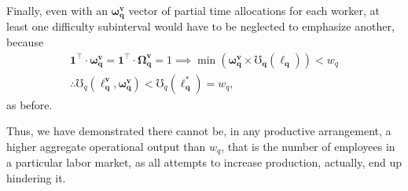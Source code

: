 \documentclass[hidelinks, nonatbib]{elsarticle}
\begin{document}
\begin{enumerate}
    Finally, even with an $\boldsymbol{\omega_{q}^{v}}$ vector of partial time allocations for each worker, at least one difficulty subinterval would have to be neglected to emphasize another, because
    \begin{gather}
        \boldsymbol{1} ^ \top
        \cdot
        \boldsymbol{\omega_{q}^{v}}
        =
        \boldsymbol{1} ^ \top
        \cdot
        \boldsymbol{\Omega_{q}^{v}}
        =
        1
        \implies
        \min\left(
            \boldsymbol{\omega_{q}^{v}}
            \times
            \boldsymbol{\mho_q}(
                \boldsymbol{\ell_{q}}
            )
        \right)
        <
        w_q
        \\
        \therefore
        \mho_q(
            \boldsymbol{\ell_{q}^{v}},
            \boldsymbol{\omega_{q}^{v}}
        )
        <
        \mho_q(
            \boldsymbol{\ell_{q}^{*}}
        )
        =
        w_q
        ,
    \end{gather}
    as before.

    Thus, we have demonstrated there cannot be, in any productive arrangement, a higher aggregate operational output than $w_q$, that is the number of employees in a particular labor market, as all attempts to increase production, actually, end up hindering it. 
    

\end{enumerate}
\end{document}
